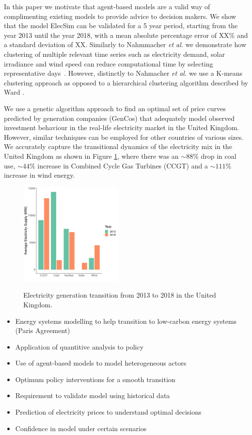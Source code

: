 \documentclass[final,3p,times,twocolumn,numbers]{elsarticle}
\begin{document}
In this paper we motivate that agent-based models are a valid way of complimenting existing models to provide advice to decision makers. We show that the model ElecSim \cite{Kell} can be validated for a 5 year period, starting from the year 2013 until the year 2018, with a mean absolute percentage error of {\color{red} XX\%} and a standard deviation of {\color{red}XX}. Similarly to Nahmmacher \textit{et al.} we demonstrate how clustering of multiple relevant time series such as electricity demand, solar irradiance and wind speed can reduce computational time by selecting representative days~\cite{Nahmmacher2016}. However, distinctly to Nahmacher \textit{et al.} we use a K-means clustering approach \cite{forgy65} as opposed to a hierarchical clustering algorithm described by Ward \cite{doi:10.1080/01621459.1963.10500845}.

We use a genetic algorithm approach to find an optimal set of price curves predicted by generation companies (GenCos) that  adequately model observed investment behaviour in the real-life electricity market in the United Kingdom. However, similar techniques can be employed for other countries of various sizes. We accurately capture the transitional dynamics of the electricity mix in the United Kingdom as shown in Figure \ref{uk_historical_mix}, where there was an $\sim88\%$ drop in coal use, $\sim44\%$ increase in Combined Cycle Gas Turbines (CCGT) and a $\sim111\% $ increase in wind energy.


\begin{figure}
\centering
\includegraphics[width=0.46\textwidth]{figures/introduction/uk_historical_mix.pdf}
\label{uk_historical_mix}
\caption{Electricity generation transition from 2013 to 2018 in the United Kingdom.}
\end{figure}


\begin{itemize}
	\item Energy systems modelling to help transition to low-carbon energy systems (Paris Agreement)
	\item Application of quantitive analysis to policy
	\item Use of agent-based models to model heterogeneous actors
	\item Optimum policy interventions for a smooth transition
	\item Requirement to validate model using historical data
	\item Prediction of electricity prices to understand optimal decisions
	\item Confidence in model under certain scenarios
\end{itemize}
\end{document}
